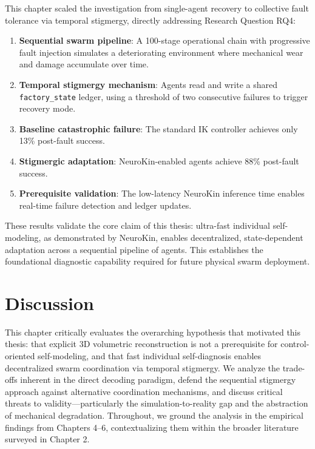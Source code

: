 \documentclass[12pt,a4paper,oneside]{report}
\begin{document}
This chapter scaled the investigation from single-agent recovery to collective fault tolerance via temporal stigmergy, directly addressing Research Question RQ4:

\begin{enumerate}
    \item \textbf{Sequential swarm pipeline}: A 100-stage operational chain with progressive fault injection simulates a deteriorating environment where mechanical wear and damage accumulate over time.
    \item \textbf{Temporal stigmergy mechanism}: Agents read and write a shared \texttt{factory\_state} ledger, using a threshold of two consecutive failures to trigger recovery mode.
    \item \textbf{Baseline catastrophic failure}: The standard IK controller achieves only 13\% post-fault success.
    \item \textbf{Stigmergic adaptation}: NeuroKin-enabled agents achieve 88\% post-fault success.
    \item \textbf{Prerequisite validation}: The low-latency NeuroKin inference time enables real-time failure detection and ledger updates.
\end{enumerate}

These results validate the core claim of this thesis: ultra-fast individual self-modeling, as demonstrated by NeuroKin, enables decentralized, state-dependent adaptation across a sequential pipeline of agents. This establishes the foundational diagnostic capability required for future physical swarm deployment.





















\chapter{Discussion}

This chapter critically evaluates the overarching hypothesis that motivated this thesis: that explicit 3D volumetric reconstruction is not a prerequisite for control-oriented self-modeling, and that fast individual self-diagnosis enables decentralized swarm coordination via temporal stigmergy. We analyze the trade-offs inherent in the direct decoding paradigm, defend the sequential stigmergy approach against alternative coordination mechanisms, and discuss critical threats to validity—particularly the simulation-to-reality gap and the abstraction of mechanical degradation. Throughout, we ground the analysis in the empirical findings from Chapters 4–6, contextualizing them within the broader literature surveyed in Chapter 2.
\end{document}
